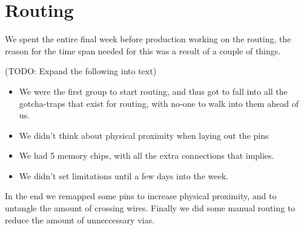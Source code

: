 \section {Routing}

We spent the entire final week before production working on the routing,
the reason for the time span needed for this was a result of a couple of
things.

(TODO: Expand the following into text)
\begin {itemize}
\item We were the first group to start routing, and thus got to fall into all the gotcha-traps that
exist for routing, with no-one to walk into them ahead of us.
\item We didn't think about physical proximity when laying out the pins
\item We had 5 memory chips, with all the extra connections that implies.
\item We didn't set limitations until a few days into the week.
\end {itemize}

In the end we remapped some pins to increase physical proximity, and to untangle the
amount of crossing wires. Finally we did some manual routing to reduce the amount of
unneccessary vias.
